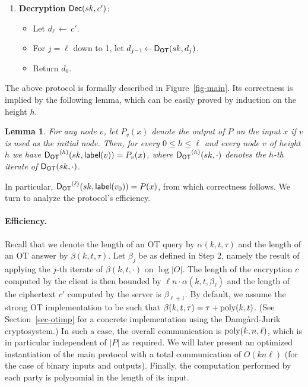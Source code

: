 \documentclass[11pt]{article}
\newtheorem{lemma}[theorem]{Lemma}
\newcommand{\from}{{\,\leftarrow\,}}
\newcommand{\poly}{{\mbox{\rm poly}}}
\newcommand{\lab}{{\mathsf{label}}}
\newcommand{\dec}{{\sf Dec}}
\newcommand{\ansot}{{\sf A_{OT}}}
\newcommand{\decot}{{\sf D_{OT}}}
\newcommand{\otl}{{\tau}}
\newcommand{\height}{{\sf height}}
\begin{document}
{\begin{enumerate}
\begin{itemize}
\begin{itemize}
      children are labeled.
      \item Let $i\from\psi_V(v)$ and $h\from\height(v)$.
      \item Let
      $\lab(v)\from \ansot(pk,q_i^h,
      \lab(u_0),\ldots,\lab(u_{t-1}))$,
      where $u_m$ is the (unique) node such that $m\in{\psi_E(v,u_m)}$.
      \\Note that the nodes $u_m$ are not necessarily distinct.
      \end{itemize}
    \item Return $c'=\lab(v_0)$.
    \end{itemize}
 \item {\bf Decryption} $\dec(sk,c')$:
 \begin{itemize}
    \item Let $d_\ell\from c'$.
    \item For $j=\ell$ down to 1,
    let $d_{j-1}\from\decot(sk, d_j)$.
    \item Return $d_0$.
 \end{itemize}
\end{enumerate}
}

The above protocol is formally described in Figure~\ref{fig-main}.
Its correctness is implied by the following lemma, which can be
easily proved by induction on the height $h$.
\begin{lemma}
\label{lem-correct} For any node $v$, let $P_v(x)$ denote the output
of $P$ on the input $x$ if $v$ is used as the initial node.  Then,
for every $0\le h\le \ell$ and every node $v$ of height $h$ we have
$\decot^{(h)}(sk,\lab(v))=P_v(x)$, where $\decot^{(h)}(sk,\cdot)$
denotes the $h$-th iterate of $\decot(sk,\cdot)$.
\end{lemma}
In particular, $\decot^{(\ell)}(sk,\lab(v_0))=P(x)$, from which
correctness follows. We turn to analyze the protocol's efficiency.

\paragraph{Efficiency.} Recall that we denote the length of an OT query by
$\alpha(k,t,\otl)$ and the length of an OT answer by
$\beta(k,t,\otl)$. Let $\beta_j$ be as defined in Step 2, namely the
result of applying the $j$-th iterate of $\beta(k,t,\cdot)$ on
$\log|O|$. The length of the encryption $c$ computed by the client
is then bounded by $\ell n\cdot\alpha(k,t,\beta_\ell)$ and the
length of the ciphertext $c'$ computed by the server is
$\beta_{\ell+1}$. By default, we assume the strong OT implementation
to be such that $\beta(k,t,\otl)=\otl+\poly(k,t)$. (See
Section~\ref{sec-otimp} for a concrete implementation using the
Damg{\aa}rd-Jurik cryptosystem.) In such a case, the overall
communication is $\poly(k,n,\ell)$, which is in particular
independent of $|P|$ as required.  We will later present an
optimized instantiation of the main protocol with a total
communication of $O(kn\ell)$ (for the case of binary inputs and
outputs). Finally, the computation performed by each party is
polynomial in the length of its input.
\end{document}
